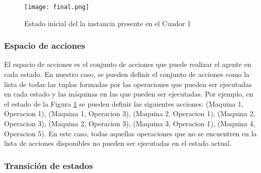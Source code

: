 \begin{figure}[ht]
    \centering
    \texttt{[image: final.png]}
    \caption{Estado inicial del la instancia presente en el Cuador 1}
    \label{fig:final-solution}
\end{figure}



\subsubsection{Espacio de acciones}
El espacio de acciones es el conjunto de acciones que puede realizar el agente en cada estado. 
En nuestro caso, se pueden definir el conjunto de acciones como la lista de todas las tuplas 
formadas por las operaciones que pueden ser ejecutadas en cada estado y las máquinas en las que
pueden ser ejecutadas. Por ejemplo, en el estado de la Figura \ref{fig:final-solution} se pueden
definir las siguientes acciones: (Maquina 1, Operacion 1), (Maquina 1, Operacion 3), 
(Maquina 2, Operacion 1), (Maquina 2, Operacion 3), (Maquina 2, Operacion 3), (Maquina 3, Operacion 1), 
(Maquina 4, Operacion 5). En este caso, todas aquellas operaciones que no se encuentren en la lista 
de acciones disponibles no pueden ser ejecutadas en el estado actual.

\subsubsection{Transición de estados}

\pagebreak
